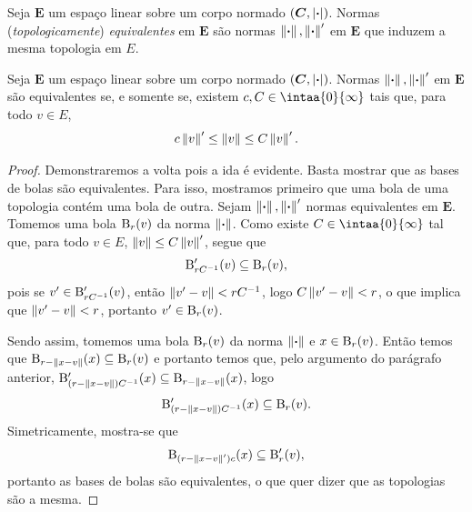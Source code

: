 \begin{defi}
Seja $\bm E$ um espaço linear sobre um corpo normado $(\bm C,\left\vert{\bm{\cdot}}\right\vert)$. Normas (\emph{topologicamente}) \emph{equivalentes} em $\bm E$ são normas $\left\Vert{\bm{\cdot}}\right\Vert, \left\Vert{\bm{\cdot}}\right\Vert'$ em $\bm E$ que induzem a mesma topologia em $E$.
\end{defi}

\begin{prop}
Seja $\bm E$ um espaço linear sobre um corpo normado $(\bm C,\left\vert{\bm{\cdot}}\right\vert)$. Normas $\left\Vert{\bm{\cdot}}\right\Vert, \left\Vert{\bm{\cdot}}\right\Vert'$ em $\bm E$ são equivalentes se, e somente se, existem $c,C \in \intaa{0}{\infty}$ tais que, para todo $v \in E$,
	\begin{equation*}
	c \left\Vert{v}\right\Vert' \leq \left\Vert{v}\right\Vert \leq C \left\Vert{v}\right\Vert'.
	\end{equation*}
\end{prop}
\begin{proof}
Demonstraremos a volta pois a ida é evidente.
Basta mostrar que as bases de bolas são equivalentes. Para isso, mostramos primeiro que uma bola de uma topologia contém uma bola de outra. Sejam $\left\Vert{\bm{\cdot}}\right\Vert, \left\Vert{\bm{\cdot}}\right\Vert'$ normas equivalentes em $\bm E$. Tomemos uma bola $\mathrm{B}_r(v)$ da norma $\left\Vert{\bm{\cdot}}\right\Vert$. Como existe $C \in \intaa{0}{\infty}$ tal que, para todo $v \in E$, $\left\Vert{v}\right\Vert \leq C \left\Vert{v}\right\Vert'$, segue que
	\begin{equation*}
	\mathrm{B}'_{rC^{-1}}(v) \subseteq \mathrm{B}_r(v),
	\end{equation*}
pois se $v' \in \mathrm{B}'_{rC^{-1}}(v)$, então $\left\Vert{v'-v}\right\Vert < rC^{-1}$, logo $C\left\Vert{v'-v}\right\Vert < r$, o que implica que $\left\Vert{v'-v}\right\Vert < r$, portanto $v' \in \mathrm{B}_r(v)$.

Sendo assim, tomemos uma bola $\mathrm{B}_r(v)$ da norma $\left\Vert{\bm{\cdot}}\right\Vert$ e $x \in \mathrm{B}_r(v)$. Então temos que $\mathrm{B}_{r-\left\Vert{x-v}\right\Vert}(x) \subseteq \mathrm{B}_r(v)$
e portanto temos que, pelo argumento do parágrafo anterior, $\mathrm{B}'_{(r-\left\Vert{x-v}\right\Vert)C^{-1}}(x) \subseteq \mathrm{B}_{r-\left\Vert{x-v}\right\Vert}(x)$, logo
	\begin{equation*}
	\mathrm{B}'_{(r-\left\Vert{x-v}\right\Vert)C^{-1}}(x) \subseteq \mathrm{B}_r(v).
	\end{equation*}
Simetricamente, mostra-se que
	\begin{equation*}
	\mathrm{B}_{(r-\left\Vert{x-v}\right\Vert')c}(x) \subseteq \mathrm{B}'_r(v),
	\end{equation*}
portanto as bases de bolas são equivalentes, o que quer dizer que as topologias são a mesma.
\end{proof}




